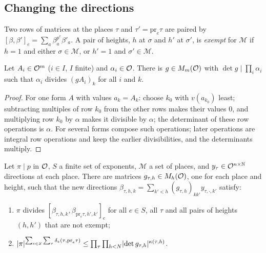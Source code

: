 \subsection{Changing the directions}\label{ss:null-frames}
Two rows of matrices at the places $\tau$ and $\tau'=\mathrm{pr}_e\tau$ are paired by
$[\beta,\beta']_e=\sum_a\beta_a^{p^e}\beta'_a$. A pair of heights, $h$ at $\sigma$ and $h'$ at
$\sigma'$, is \emph{exempt} for $\mathcal M$ if $h=1$ and either $\sigma\in\mathcal M$, or $h'=1$ and
$\sigma'\in\mathcal M$.

\begin{lemma}[Elimination]\label{lem:elimination}
Let $A_i\in\mathcal{O}^m$ ($i\in I$, $I$ finite) and $\alpha_i\in\mathcal{O}$. There is $g\in M_m(\mathcal{O})$ with
$\det g\mid\prod_i\alpha_i$ such that $\alpha_i$ divides $(gA_i)_k$ for all $i$ and $k$.
\end{lemma}

\begin{proof}
For one form $A$ with values $a_k=A_k$: choose $k_0$ with $v(a_{k_0})$ least; subtracting multiples of
row $k_0$ from the other rows makes their values $0$, and multiplying row $k_0$ by $\alpha$ makes
it divisible by $\alpha$; the determinant of these row operations is $\alpha$. For several forms
compose such operations; later operations are integral row operations and keep the earlier
divisibilities, and the determinants multiply.
\end{proof}

\begin{proposition}\label{prop:new-directions}
Let $\pi\mid p$ in $\mathcal{O}$, $S$ a finite set of exponents, $\mathcal M$ a set of places, and
$y_\tau\in\mathcal{O}^{n\times\mathbb{N}}$ directions at each place. There are matrices $g_{\tau,h}\in M_h(\mathcal{O})$, one
for each place and height, such that the new directions
$\beta_{\tau,h,k}=\sum_{k'<h}(g_{\tau,h})_{kk'}y_{\tau,\cdot,k'}$ satisfy:
\begin{enumerate}[label=\textup{(\roman*)}]
\item $\pi$ divides $[\beta_{\tau,h,k},\beta_{\mathrm{pr}_e\tau,h',k'}]_e$ for all $e\in S$, all
$\tau$ and all pairs of heights $(h,h')$ that are not exempt;
\item $\lvert \pi\rvert^{\sum_{e\in S}\sum_\tau\delta_e(\tau,\mathrm{pr}_e\tau)}\le
\prod_\tau\prod_{h<N}\lvert \det g_{\tau,h}\rvert^{\kappa(\tau,h)}$.
\end{enumerate}
\end{proposition}

